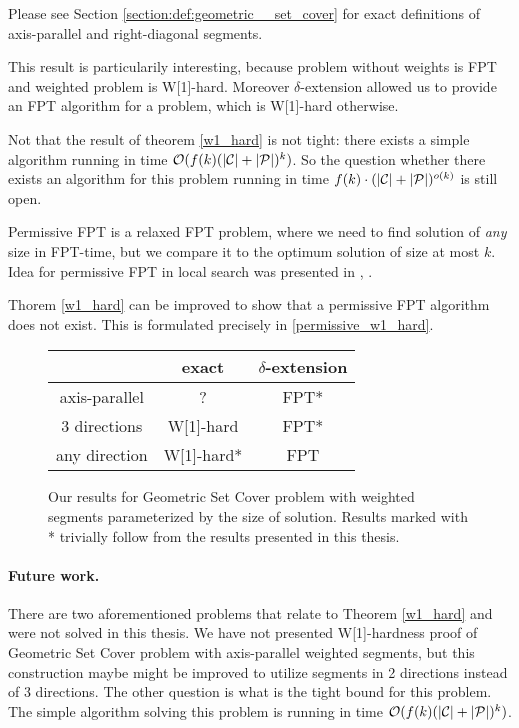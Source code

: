 Please see Section \ref{section:def:geometric__set_cover}
for exact definitions of axis-parallel and right-diagonal segments.

This result is particularily interesting,
because problem without weights is FPT and weighted problem is W[1]-hard.
Moreover $\delta$-extension allowed us to provide an FPT algorithm
for a problem, which is W[1]-hard otherwise.

Not that the result of theorem \ref{w1_hard} is not tight:
there exists a simple algorithm 
running in time ${\mathcal{O}(f(k)(|\mathcal{C}| + |\mathcal{P}|)^k)}$.
So the question whether there exists an algorithm
for this problem running in time ${f(k)\cdot(|\mathcal{C}| + |\mathcal{P}|)^{o(k)}}$
is still open.

Permissive FPT is a relaxed FPT problem, where 
we need to find solution of \textit{any} size in FPT-time,
but we compare it to the optimum solution of size at most $k$.
Idea for permissive FPT in local search was presented
in \cite{permissive_problem1}, \cite{permissive_problem2}.

Thorem \ref{w1_hard} can be improved to show that a permissive FPT
algorithm does not exist.
This is formulated precisely in \ref{permissive_w1_hard}.

\begin{figure}[h]
\begin{center}
\begin{tabular}{ | c | c | c | }
\hline
                & exact     & $\delta$-extension \\ 
\hline                
 axis-parallel   & ? & FPT* \\  
\hline                
 3 directions    & W[1]-hard & FPT* \\  
\hline                
 any direction   & W[1]-hard* & FPT \\
\hline                
\end{tabular}
\caption{Our results for Geometric Set Cover problem with weighted segments 
parameterized by the size of solution.
Results marked with * trivially follow from the results presented in this thesis.}
\label{tab:weighted_fpt}
\end{center}
\end{figure}

\paragraph{Future work.} There are two aforementioned problems
that relate to Theorem \ref{w1_hard} and were not solved in this thesis.
We have not presented W[1]-hardness proof
of Geometric Set Cover problem with axis-parallel weighted segments,
but this construction maybe might be improved to utilize segments
in 2 directions instead of 3 directions. 
The other question is what is the tight bound for this problem.
The simple algorithm solving
this problem is running in time ${\mathcal{O}(f(k)(|\mathcal{C}| + |\mathcal{P}|)^k)}$.

